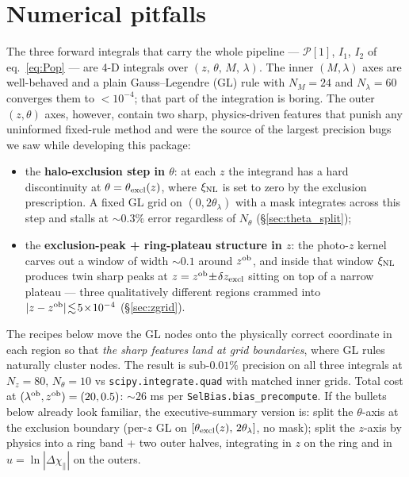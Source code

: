 \documentclass[a4paper, 11pt]{article}
\newcommand{\lob}{\lambda^{\rm ob}}
\newcommand{\zob}{z^{\rm ob}}
\newcommand{\xinl}{\xi_{\rm NL}}
\newcommand{\Pop}{\mathcal{P}}
\begin{document}
\section*{\textcolor{harvardcrimson}{Numerical pitfalls}}

The three forward integrals that carry the whole pipeline ---
\(\Pop[1]\), \(I_1\), \(I_2\) of eq.~\eqref{eq:Pop} --- are 4-D
integrals over \((z,\,\theta,\,M,\,\lambda)\). The inner
\((M,\lambda)\) axes are well-behaved and a plain
Gauss--Legendre (GL) rule with \(N_M\!=\!24\) and
\(N_\lambda\!=\!60\) converges them to \(<\!10^{-4}\); that part
of the integration is boring. The outer \((z,\theta)\) axes,
however, contain two sharp, physics-driven features that punish
any uninformed fixed-rule method and were the source of the
largest precision bugs we saw while developing this package:

\begin{itemize}
  \item the \textbf{halo-exclusion step in \(\theta\)}: at each
        \(z\) the integrand has a hard discontinuity at
        \(\theta=\theta_{\rm excl}(z)\), where \(\xinl\) is set
        to zero by the exclusion prescription. A fixed GL grid on
        \((0,2\theta_\lambda)\) with a mask integrates across this
        step and stalls at \(\sim 0.3\%\) error regardless of
        \(N_\theta\) (\S\ref{sec:theta_split});
  \item the \textbf{exclusion-peak + ring-plateau structure in
        \(z\)}: the photo-\(z\) kernel carves out a window of
        width \(\sim\!0.1\) around \(\zob\), and inside that
        window \(\xinl\) produces twin sharp peaks at
        \(z=\zob\!\pm\!\delta z_{\rm excl}\) sitting on top of a
        narrow plateau --- three qualitatively different regions
        crammed into \(|z-\zob|\!\lesssim\!5\!\times\!10^{-4}\)
        (\S\ref{sec:zgrid}).
\end{itemize}

The recipes below move the GL nodes onto the physically correct
coordinate in each region so that \emph{the sharp features land
at grid boundaries}, where GL rules naturally cluster nodes. The
result is sub-\(0.01\%\) precision on all three integrals at
\(N_z\!=\!80\), \(N_\theta\!=\!10\) vs
\texttt{scipy.integrate.quad} with matched inner grids. Total cost
at \((\lob,\zob)=(20,0.5)\): \(\sim 26\) ms per
\texttt{SelBias.bias\_precompute}. If the bullets below already
look familiar, the executive-summary version is: split the
\(\theta\)-axis at the exclusion boundary (per-\(z\) GL on
\([\theta_{\rm excl}(z),\,2\theta_\lambda]\), no mask); split the
\(z\)-axis by physics into a ring band + two outer halves,
integrating in \(z\) on the ring and in
\(u=\ln|\Delta\chi_\parallel|\) on the outers.
\end{document}
